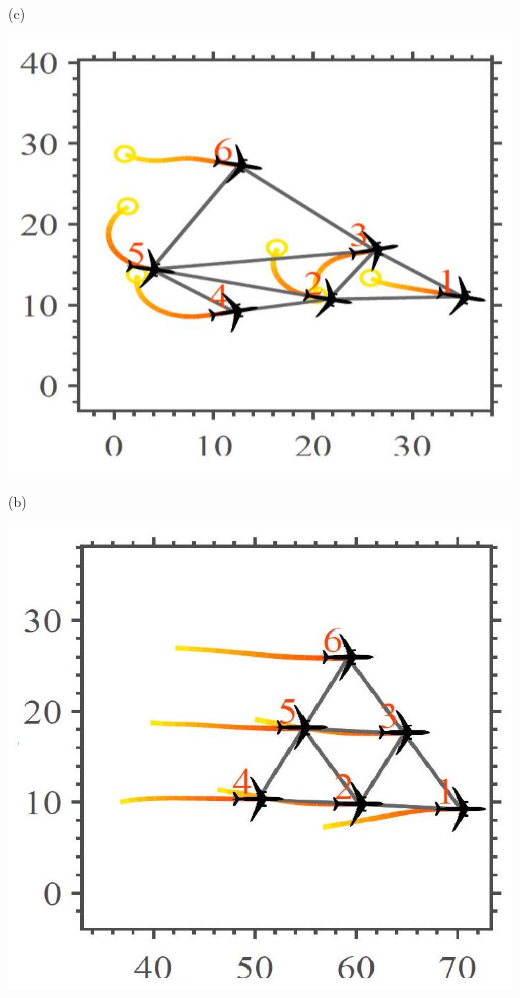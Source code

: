 \documentclass[10pt]{article}
\begin{document}
(c)

\begin{center}
\includegraphics[max width=\textwidth]{2023_10_07_53b70c7408bc8e139415g-39(1)}
\end{center}

(b)

\begin{center}
\includegraphics[max width=\textwidth]{2023_10_07_53b70c7408bc8e139415g-39}
\end{center}
\end{document}
